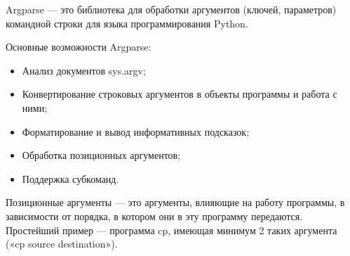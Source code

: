 
Argparse --- это библиотека для обработки аргументов (ключей, параметров) командной строки для языка программирования Python. 

Основные возможности Argparse:
\begin{itemize}
\item Анализ документов sys.argv;
\item Конвертирование строковых аргументов в объекты программы и работа с ними;
\item Форматирование и вывод информативных подсказок;
\item Обработка позиционных аргументов;
\item Поддержка субкоманд.
\end{itemize}

Позиционные аргументы — это аргументы, влияющие на работу программы, в зависимости от порядка, в котором они в эту программу передаются. Простейший пример — программа cp, имеющая минимум 2 таких аргумента («cp source destination»).